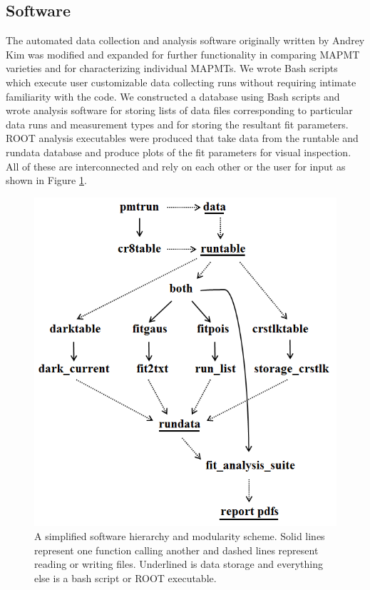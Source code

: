 \documentclass[prc,twocolumn]{revtex4}
\begin{document}
	\subsection{Software}
		
		The automated data collection and analysis software originally written by Andrey Kim was modified and expanded for further functionality in comparing MAPMT varieties and for characterizing individual MAPMTs. We wrote Bash scripts which execute user customizable data collecting runs without requiring intimate familiarity with the code.  We constructed a database using Bash scripts and wrote analysis software for storing lists of data files corresponding to particular data runs and measurement types and for storing the resultant fit parameters.  ROOT analysis executables were produced that take data from the runtable and rundata database and produce plots of the fit parameters for visual inspection. All of these are interconnected and rely on each other or the user for input as shown in Figure \ref{software}.
		
		\begin{figure}
			\includegraphics[width=0.8\linewidth]{software.png}
			\caption{A simplified software hierarchy and modularity scheme. Solid lines represent one function calling another and dashed lines represent reading or writing files. Underlined is data storage and everything else is a bash script or ROOT executable.}
			\label{software}
		\end{figure}
		
\end{document}
